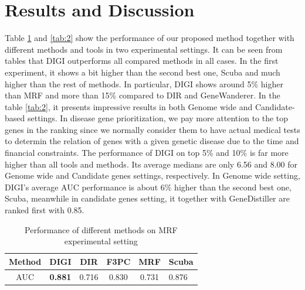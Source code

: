\section{Results and Discussion}
Table \ref{tab:1} and \ref{tab:2} show the performance of our proposed method together with different methods and tools in two experimental settings. It can be seen from tables that DIGI outperforms all compared methods in all cases. In the first experiment, it shows a bit higher than the second best one, Scuba and much higher than the rest of methods. In particular, DIGI shows around 5$\%$ higher than MRF and more than 15$\%$ compared to DIR and GeneWanderer. In the table \ref{tab:2}, it presents impressive results in both Genome wide and Candidate-based settings. In disease gene prioritization, we pay more attention to the top genes in the ranking since we normally consider them to have actual medical tests to determin the relation of genes with a given genetic disease due to the time and financial constraints. The performance of DIGI on top 5$\%$ and 10$\%$ is far more higher than all tools and methods. Its average medians are only 6.56 and 8.00 for Genome wide and Candidate genes settings, respectively. In Genome wide setting, DIGI's average AUC performance is about 6$\%$ higher than the second best one, Scuba, meanwhile in candidate genes setting, it together with GeneDistiller are ranked first with 0.85.
\begin{table}
  \caption{Performance of different methods on MRF experimental setting}
  \label{tab:1}
  \begin{tabular}{cccccl}
    \toprule
    Method & \textbf{DIGI} & DIR & F3PC & MRF & Scuba \\
    \midrule
    AUC & \textbf{0.881} & 0.716 & 0.830 & 0.731 & 0.876 \\    
    \bottomrule
  \end{tabular}
\end{table}


